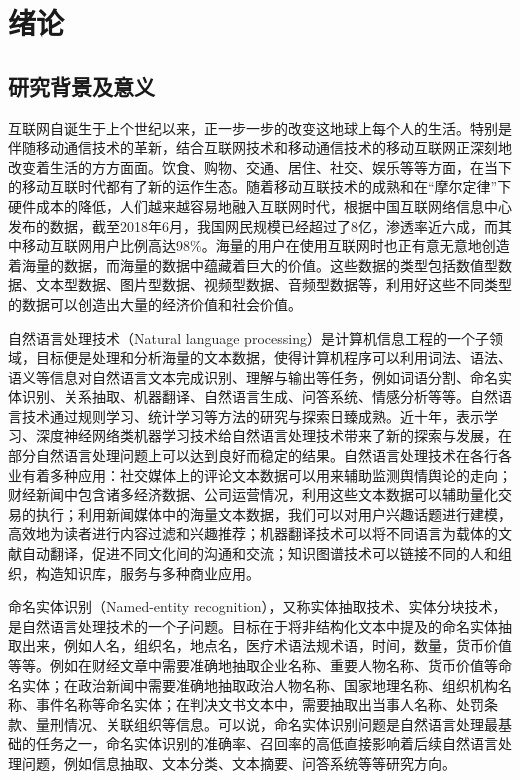\documentclass[winfonts,master,oneside,nobackinfo]{njuthesis}
\begin{document}
\mainmatter

\chapter{绪论}\label{chapter_introduction}
\section{研究背景及意义}
互联网自诞生于上个世纪以来，正一步一步的改变这地球上每个人的生活。特别是伴随移动通信技术的革新，结合互联网技术和移动通信技术的移动互联网正深刻地改变着生活的方方面面。饮食、购物、交通、居住、社交、娱乐等等方面，在当下的移动互联时代都有了新的运作生态。随着移动互联技术的成熟和在“摩尔定律”下硬件成本的降低，人们越来越容易地融入互联网时代，根据中国互联网络信息中心发布的数据，截至2018年6月，我国网民规模已经超过了8亿，渗透率近六成，而其中移动互联网用户比例高达98\%。海量的用户在使用互联网时也正有意无意地创造着海量的数据，而海量的数据中蕴藏着巨大的价值。这些数据的类型包括数值型数据、文本型数据、图片型数据、视频型数据、音频型数据等，利用好这些不同类型的数据可以创造出大量的经济价值和社会价值。

自然语言处理技术（Natural language processing）是计算机信息工程的一个子领域，目标便是处理和分析海量的文本数据，使得计算机程序可以利用词法、语法、语义等信息对自然语言文本完成识别、理解与输出等任务，例如词语分割、命名实体识别、关系抽取、机器翻译、自然语言生成、问答系统、情感分析等等。自然语言技术通过规则学习、统计学习等方法的研究与探索日臻成熟。近十年，表示学习、深度神经网络类机器学习技术给自然语言处理技术带来了新的探索与发展，在部分自然语言处理问题上可以达到良好而稳定的结果。自然语言处理技术在各行各业有着多种应用：社交媒体上的评论文本数据可以用来辅助监测舆情舆论的走向；财经新闻中包含诸多经济数据、公司运营情况，利用这些文本数据可以辅助量化交易的执行；利用新闻媒体中的海量文本数据，我们可以对用户兴趣话题进行建模，高效地为读者进行内容过滤和兴趣推荐；机器翻译技术可以将不同语言为载体的文献自动翻译，促进不同文化间的沟通和交流；知识图谱技术可以链接不同的人和组织，构造知识库，服务与多种商业应用。

命名实体识别（Named-entity recognition），又称实体抽取技术、实体分块技术，是自然语言处理技术的一个子问题。目标在于将非结构化文本中提及的命名实体抽取出来，例如人名，组织名，地点名，医疗术语法规术语，时间，数量，货币价值等等。例如在财经文章中需要准确地抽取企业名称、重要人物名称、货币价值等命名实体；在政治新闻中需要准确地抽取政治人物名称、国家地理名称、组织机构名称、事件名称等命名实体；在判决文书文本中，需要抽取出当事人名称、处罚条款、量刑情况、关联组织等信息。可以说，命名实体识别问题是自然语言处理最基础的任务之一，命名实体识别的准确率、召回率的高低直接影响着后续自然语言处理问题，例如信息抽取、文本分类、文本摘要、问答系统等等研究方向。
\end{document}
